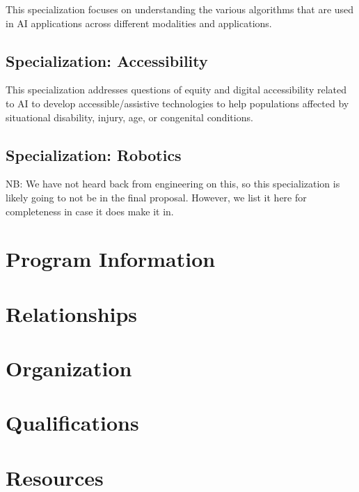 \documentclass[
10pt, %
a4paper, %
oneside, %
headinclude,footinclude, %
BCOR5mm, %
]{scrartcl}
\begin{document}
This specialization focuses on understanding the various algorithms that are used in AI applications across different modalities and applications.



\subsection{Specialization: Accessibility}

This specialization addresses questions of equity and digital accessibility related to AI to develop accessible/assistive technologies to help populations affected by situational disability, injury, age, or congenital conditions.



\subsection{Specialization: Robotics}

NB: We have not heard back from engineering on this, so this specialization is likely going to not be in the final proposal.  However, we list it here for completeness in case it does make it in. 




\section{Program Information}




\section{Relationships}




\section{Organization}


\section{Qualifications}



\section{Resources}
\end{document}
